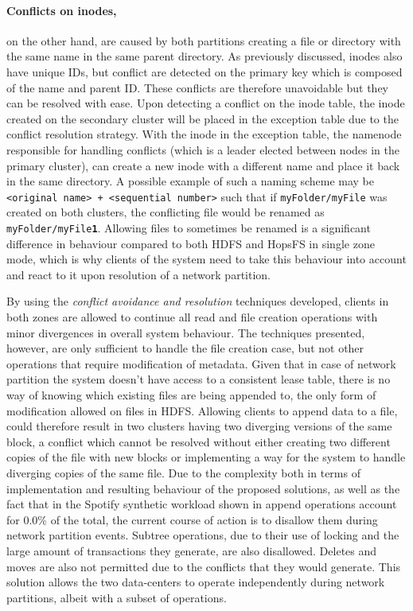 \paragraph{Conflicts on inodes,} on the other hand, are caused by both partitions creating a file or directory with the same name in the same parent directory.
As previously discussed, inodes also have unique IDs, but conflict are detected on the primary key which is composed of the name and parent ID. 
These conflicts are therefore unavoidable but they can be resolved with ease.
Upon detecting a conflict on the inode table, the inode created on the secondary cluster will be placed in the exception table due to the conflict resolution strategy.
With the inode in the exception table, the namenode responsible for handling conflicts (which is a leader elected between nodes in the primary cluster), can create a new inode with a different name and place it back in the same directory.
A possible example of such a naming scheme may be \texttt{<original name> + <sequential number>} such that if \texttt{myFolder/myFile} was created on both clusters, the conflicting file would be renamed as \texttt{myFolder/myFile\textbf{1}}.
Allowing files to sometimes be renamed is a significant difference in behaviour compared to both HDFS and HopsFS in single zone mode, which is why clients of the system need to take this behaviour into account and react to it upon resolution of a network partition.

By using the \emph{conflict avoidance and resolution} techniques developed, clients in both zones are allowed to continue all read and file creation operations with minor divergences in overall system behaviour.
The techniques presented, however, are only sufficient to handle the file creation case, but not other operations that require modification of metadata.
Given that in case of network partition the system doesn't have access to a consistent lease table, there is no way of knowing which existing files are being appended to, the only form of modification allowed on files in HDFS.
Allowing clients to append data to a file, could therefore result in two clusters having two diverging versions of the same block, a conflict which cannot be resolved without either creating two different copies of the file with new blocks or implementing a way for the system to handle diverging copies of the same file.
Due to the complexity both in terms of implementation and resulting behaviour of the proposed solutions, as well as the fact that in the Spotify synthetic workload shown in \cite{DBLP:conf/dais/NiaziIBD15} append operations account for 0.0\% of the total, the current course of action is to disallow them during network partition events.
Subtree operations, due to their use of locking and the large amount of transactions they generate, are also disallowed.
Deletes and moves are also not permitted due to the conflicts that they would generate.
This solution allows the two data-centers to operate independently during network partitions, albeit with a subset of operations.

